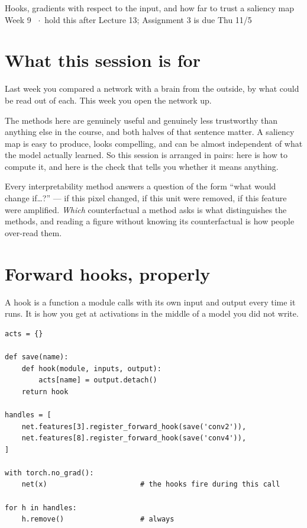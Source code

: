 \documentclass[11pt]{article}
\begin{document}
  {Hooks, gradients with respect to the input, and how far to trust a saliency map}
  {Week 9 \ $\cdot$\ hold this after Lecture 13; Assignment 3 is due Thu 11/5}

\section*{What this session is for}

Last week you compared a network with a brain from the outside, by what could be
read out of each. This week you open the network up.

The methods here are genuinely useful and genuinely less trustworthy than
anything else in the course, and both halves of that sentence matter. A saliency
map is easy to produce, looks compelling, and can be almost independent of what
the model actually learned. So this session is arranged in pairs: here is how to
compute it, and here is the check that tells you whether it means anything.

\begin{keybox}
 Every interpretability method answers a question of the form
``what would change if\dots?'' --- if this pixel changed, if this unit were
removed, if this feature were amplified. \emph{Which} counterfactual a method
asks is what distinguishes the methods, and reading a figure without knowing its
counterfactual is how people over-read them.
\end{keybox}

\section{Forward hooks, properly}

A hook is a function a module calls with its own input and output every time it
runs. It is how you get at activations in the middle of a model you did not
write.

\begin{lstlisting}
acts = {}

def save(name):
    def hook(module, inputs, output):
        acts[name] = output.detach()
    return hook

handles = [
    net.features[3].register_forward_hook(save('conv2')),
    net.features[8].register_forward_hook(save('conv4')),
]

with torch.no_grad():
    net(x)                      # the hooks fire during this call

for h in handles:
    h.remove()                  # always
\end{lstlisting}
\end{document}
